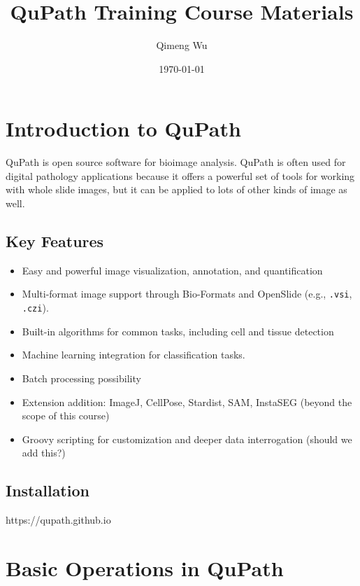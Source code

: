 \documentclass[a4paper,12pt]{article}
\begin{document}
\title{QuPath Training Course Materials}
\author{Qimeng Wu}
\date{\today}

\maketitle
\tableofcontents
\newpage


\section{Introduction to QuPath}

QuPath is open source software for bioimage analysis. QuPath is often used for digital pathology applications because it offers a powerful set of tools for working with whole slide images, but it can be applied to lots of other kinds of image as well. 

\subsection{Key Features}
\begin{itemize}
    \item Easy and powerful image visualization, annotation, and quantification
    \item Multi-format image support through Bio-Formats and OpenSlide (e.g., \texttt{.vsi}, \texttt{.czi}).
    \item Built-in algorithms for common tasks, including cell and tissue detection
    \item Machine learning integration for classification tasks.
    \item Batch processing possibility
    \item Extension addition: ImageJ, CellPose, Stardist, SAM, InstaSEG (beyond the scope of this course)
    \item Groovy scripting for customization and deeper data interrogation (should we add this?)
\end{itemize}

\subsection{Installation}
https://qupath.github.io

\section{Basic Operations in QuPath}
\end{document}
